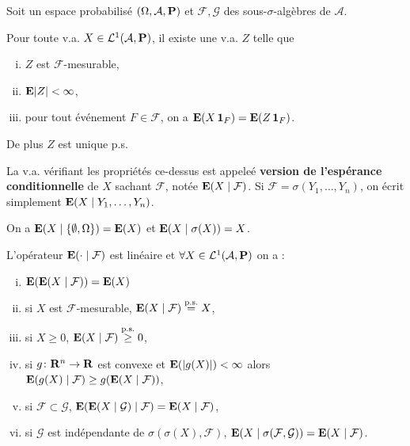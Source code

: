 Soit un espace probabilisé $(\Omega,\mathcal{A},\mathbf{P})$ et $\mathcal{F}, \mathcal{G}$ des sous-$\sigma$-algèbres de $\mathcal{A}$.

\begin{thm}
	Pour toute v.a. $X \in \mathcal{L}^1(\mathcal{A},\mathbf{P})$, il existe une v.a. $Z$ telle que
	\begin{enumerate}[(i)]
		\item $Z$ est $\mathcal{F}$-mesurable,
		\item $\mathbf{E}{\left\lvert Z\right\rvert} < \infty$,
		\item pour tout événement $F \in \mathcal{F}$, on a $\mathbf{E}(X \operatorname{\mathbf{1}}_F) = \mathbf{E}(Z \operatorname{\mathbf{1}}_F)$.
	\end{enumerate}
	De plus $Z$ est unique p.s.
\end{thm}

\begin{defn}
	La v.a. vérifiant les propriétés ce-dessus est appeleé \textbf{version de l'espérance conditionnelle} de $X$ sachant $\mathcal{F}$, notée $\mathbf{E}(X \mid \mathcal{F})$.
	Si $\mathcal{F} = \sigma(Y_1,\ldots,Y_n)$, on écrit simplement $\mathbf{E}(X \mid Y_1,\ldots,Y_n)$.
\end{defn}

\begin{ex}
	On a $\mathbf{E}(X \mid \{ \emptyset,\Omega \}) = \mathbf{E}(X)$ et $\mathbf{E}(X \mid \sigma(X)) = X$.
\end{ex}

\begin{pop}
	L'opérateur $\mathbf{E}( \cdot \mid \mathcal{F})$ est linéaire et $\forall X \in \mathcal{L}^1(\mathcal{A},\mathbf{P})$ on a :
	\begin{enumerate}[(i)]
		\item $\mathbf{E}(\mathbf{E}(X \mid \mathcal{F})) = \mathbf{E}(X)$
		\item si $X$ est $\mathcal{F}$-mesurable, $\mathbf{E}(X \mid \mathcal{F}) \overset{\text{p.s.}}{=} X$,
		\item si $X \geq 0$, $\mathbf{E}(X \mid \mathcal{F}) \overset{\text{p.s.}}{\geq} 0$,
		\item si $g \colon \mathbf{R}^n \to \mathbf{R}$ est convexe et $\mathbf{E}(\left\lvert g(X)\right\rvert) < \infty$ alors $\mathbf{E}(g(X) \mid \mathcal{F}) \geq g(\mathbf{E}(X \mid \mathcal{F}))$,
		\item si $\mathcal{F} \subset \mathcal{G}$, $\mathbf{E}(\mathbf{E}(X \mid \mathcal{G}) \mid \mathcal{F}) = \mathbf{E}(X \mid \mathcal{F})$,
		\item si $\mathcal{G}$ est indépendante de $\sigma(\sigma(X),\mathcal{F})$, $\mathbf{E}(X \mid \sigma(\mathcal{F},\mathcal{G})) = \mathbf{E}(X \mid \mathcal{F})$.
	\end{enumerate}
\end{pop}


